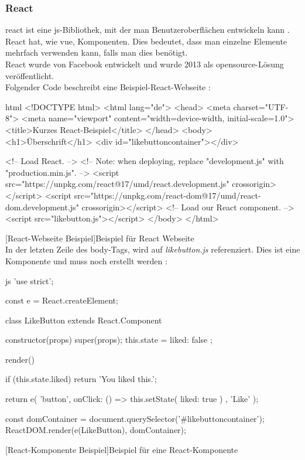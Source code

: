 \subsubsection{React}
\Gls{react} ist eine \Gls{js}-Bibliothek, mit der man Benutzeroberflächen entwickeln kann \cite{reactdoc}. React hat, wie \Gls{vue}, Komponenten. Dies bedeutet, dass man einzelne Elemente mehrfach verwenden kann, falls man dies benötigt.\\
React wurde von Facebook entwickelt und wurde 2013 als \Gls{opensource}-Lösung veröffentlicht.\\
Folgender Code beschreibt eine Beispiel-React-Webseite \cite{reactdoc}:
\begin{code}{html}
	<!DOCTYPE html>
	<html lang="de">
		<head>
			<meta charset="UTF-8">
			<meta name="viewport" content="width=device-width, initial-scale=1.0">
			<title>Kurzes React-Beispiel</title>
		</head>
		<body>
			<h1>Überschrift</h1>
			<div id="likebuttoncontainer"></div>
			
			<!-- Load React. -->
			<!-- Note: when deploying, replace "development.js" with "production.min.js". -->
			<script src="https://unpkg.com/react@17/umd/react.development.js" crossorigin></script>
			<script src="https://unpkg.com/react-dom@17/umd/react-dom.development.js" crossorigin></script>
			<!-- Load our React component. -->
			<script src="likebutton.js"></script>
		</body>
	</html>
\end{code}
[React-Webseite Beispiel]{Beispiel für React Webseite}~\\
\newpage
In der letzten Zeile des body-Tags, wird auf \textit{likebutton.js} referenziert. Dies ist eine Komponente und muss noch erstellt werden \cite{reactdoc}:
\begin{code}{js}
	'use strict';
	
	const e = React.createElement;
	
	class LikeButton extends React.Component {
		constructor(props) {
			super(props);
			this.state = { liked: false };
		}
		
		render() {
			if (this.state.liked) {
				return 'You liked this.';
			}
			
			return e(
			'button',
			{ onClick: () => this.setState({ liked: true }) },
			'Like'
			);
		}
	}
	
	const domContainer = document.querySelector('#likebuttoncontainer');
	ReactDOM.render(e(LikeButton), domContainer);
\end{code}
[React-Komponente Beispiel]{Beispiel für eine React-Komponente}
\newpage
